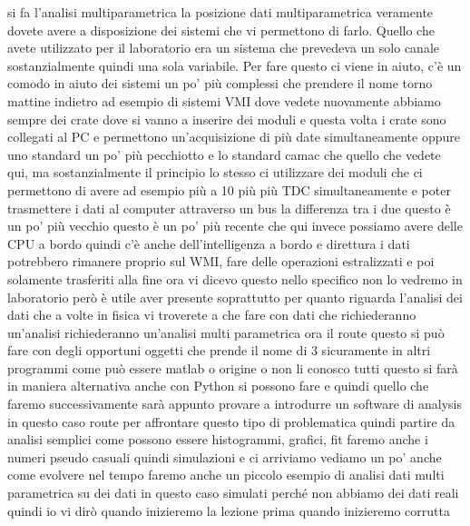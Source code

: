 si fa l'analisi multiparametrica la posizione dati multiparametrica veramente dovete avere a disposizione dei sistemi che vi permettono di farlo. Quello che avete utilizzato per il laboratorio era un sistema che prevedeva un solo canale sostanzialmente quindi una sola variabile. Per fare questo ci viene in aiuto, c'è un comodo in aiuto dei sistemi un po' più complessi che prendere il nome torno mattine indietro ad esempio di sistemi VMI dove vedete nuovamente abbiamo sempre dei crate dove si vanno a inserire dei moduli e questa volta i crate sono collegati al PC e permettono un'acquisizione di più date simultaneamente oppure uno standard un po' più pecchiotto e lo standard camac che quello che vedete qui, ma sostanzialmente il principio lo stesso ci utilizzare dei moduli che ci permettono di avere ad esempio più a 10 più più TDC simultaneamente e poter trasmettere i dati al computer attraverso un bus la differenza tra i due questo è un po' più vecchio questo è un po' più recente che qui invece possiamo avere delle CPU a bordo quindi c'è anche dell'intelligenza a bordo e direttura i dati potrebbero rimanere proprio sul WMI, fare delle operazioni estralizzati e poi solamente trasferiti alla fine ora vi dicevo questo nello specifico non lo vedremo in laboratorio però è utile aver presente soprattutto per quanto riguarda l'analisi dei dati che a volte in fisica vi troverete a che fare con dati che richiederanno un'analisi richiederanno un'analisi multi parametrica ora il route questo si può fare con degli opportuni oggetti che prende il nome di 3 sicuramente in altri programmi come può essere matlab o origine o non li conosco tutti questo si farà in maniera alternativa anche con Python si possono fare e quindi quello che faremo successivamente sarà appunto provare a introdurre un software di analysis in questo caso route per affrontare questo tipo di problematica quindi partire da analisi semplici come possono essere histogrammi, grafici, fit faremo anche i numeri pseudo casuali quindi simulazioni e ci arriviamo vediamo un po' anche come evolvere nel tempo faremo anche un piccolo esempio di analisi dati multi parametrica su dei dati in questo caso simulati perché non abbiamo dei dati reali quindi io vi dirò quando inizieremo la lezione prima quando inizieremo corrutta
